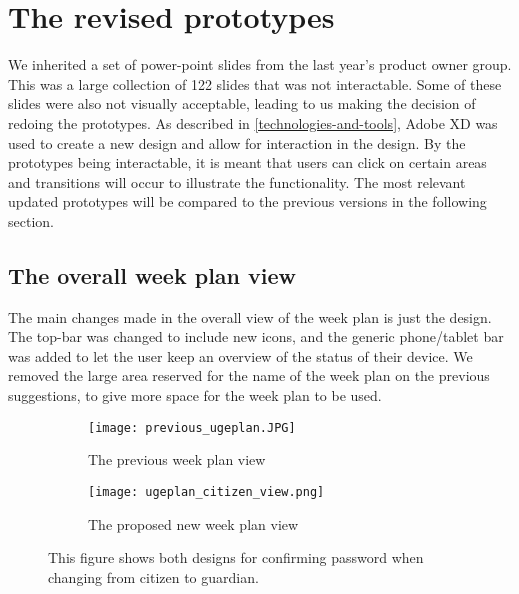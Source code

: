 \section{The revised prototypes}
We inherited a set of power-point slides from the last year's product owner group.
This was a large collection of 122 slides that was not interactable. 
Some of these slides were also not visually acceptable, leading to us making the decision of redoing the prototypes.
As described in \autoref{technologies-and-tools}, Adobe XD was used to create a new design and allow for interaction in the design.
By the prototypes being interactable, it is meant that users can click on certain areas and transitions will occur to illustrate the functionality.
The most relevant updated prototypes will be compared to the previous versions in the following section.

\subsection{The overall week plan view}
The main changes made in the overall view of the week plan is just the design. 
The top-bar was changed to include new icons, and the generic phone/tablet bar was added to let the user keep an overview of the status of their device.
We removed the large area reserved for the name of the week plan on the previous suggestions, to give more space for the week plan to be used. 
\begin{figure}[H]
    \begin{subfigure}{0.5\textwidth}
    \texttt{[image: previous\_ugeplan.JPG]} 
    \caption{The previous week plan view}
    \label{fig:previous_weekplan_view}
    \end{subfigure}
    \begin{subfigure}{0.5\textwidth}
        \texttt{[image: ugeplan\_citizen\_view.png]}
    \caption{The proposed new week plan view}
    \label{fig:new_weekplan_view}
    \end{subfigure} 
    \caption{This figure shows both designs for confirming password when changing from citizen to guardian.}
    \label{fig:weekplan_view}
\end{figure}

